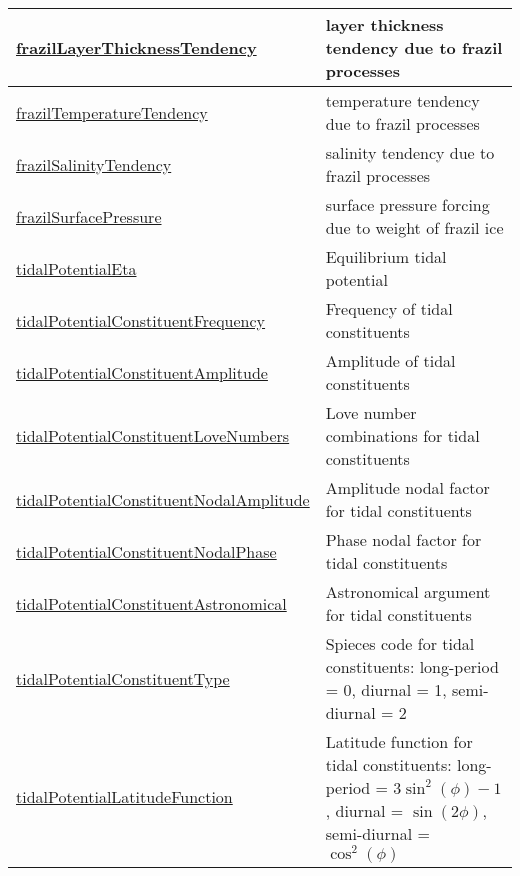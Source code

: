 {\begin{center}
\begin{longtable}{| p{2.0in} | p{4.0in} |}
    \hline
    \hyperref[subsec:var_sec_forcing_frazilLayerThicknessTendency]{frazilLayerThicknessTendency} & layer thickness tendency due to frazil processes \\
    \hline
    \hyperref[subsec:var_sec_forcing_frazilTemperatureTendency]{frazilTemperatureTendency} & temperature tendency due to frazil processes \\
    \hline
    \hyperref[subsec:var_sec_forcing_frazilSalinityTendency]{frazilSalinityTendency} & salinity tendency due to frazil processes \\
    \hline
    \hyperref[subsec:var_sec_forcing_frazilSurfacePressure]{frazilSurfacePressure} & surface pressure forcing due to weight of frazil ice \\
    \hline
    \hyperref[subsec:var_sec_forcing_tidalPotentialEta]{tidalPotentialEta} & Equilibrium tidal potential \\
    \hline
    \hyperref[subsec:var_sec_forcing_tidalPotentialConstituentFrequency]{tidalPotentialConstituent\-Frequency} & Frequency of tidal constituents \\
    \hline
    \hyperref[subsec:var_sec_forcing_tidalPotentialConstituentAmplitude]{tidalPotentialConstituent\-Amplitude} & Amplitude of tidal constituents \\
    \hline
    \hyperref[subsec:var_sec_forcing_tidalPotentialConstituentLoveNumbers]{tidalPotentialConstituentLove\-Numbers} & Love number combinations for tidal constituents \\
    \hline
    \hyperref[subsec:var_sec_forcing_tidalPotentialConstituentNodalAmplitude]{tidalPotentialConstituentNodal\-Amplitude} & Amplitude nodal factor for tidal constituents \\
    \hline
    \hyperref[subsec:var_sec_forcing_tidalPotentialConstituentNodalPhase]{tidalPotentialConstituentNodal\-Phase} & Phase nodal factor for tidal constituents \\
    \hline
    \hyperref[subsec:var_sec_forcing_tidalPotentialConstituentAstronomical]{tidalPotentialConstituent\-Astronomical} & Astronomical argument for tidal constituents \\
    \hline
    \hyperref[subsec:var_sec_forcing_tidalPotentialConstituentType]{tidalPotentialConstituentType} & Spieces code for tidal constituents: long-period = 0, diurnal = 1, semi-diurnal = 2 \\
    \hline
    \hyperref[subsec:var_sec_forcing_tidalPotentialLatitudeFunction]{tidalPotentialLatitudeFunction} & Latitude function for tidal constituents: long-period = $3\sin^2(\phi)-1$, diurnal = $\sin(2\phi)$, semi-diurnal = $\cos^2(\phi)$ \\

\end{longtable}
\end{center}}
